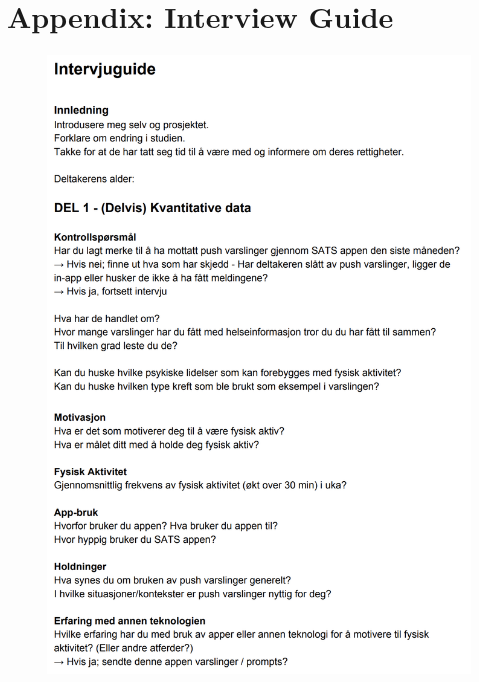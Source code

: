 \chapter{Appendix: Interview Guide}

\begin{figure}
    \centering
    \includegraphics[width=1\textwidth]{images/IG1.png}
\end{figure}

